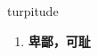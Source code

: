 
\begin{frame}
{\huge turpitude}
\begin{center}
\begin{enumerate}\Large
  \item \textbf{卑鄙，可耻}
\end{enumerate}
\end{center}
\end{frame}
